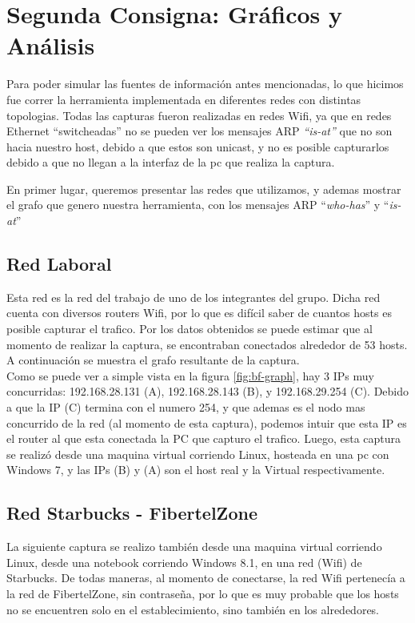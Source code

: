 \section{Segunda Consigna: Gráficos y Análisis}

Para poder simular las fuentes de información antes mencionadas, lo que hicimos fue correr la herramienta implementada en diferentes redes con distintas topologias. Todas las capturas fueron realizadas en redes Wifi, ya que en redes Ethernet ``switcheadas'' no se pueden ver los mensajes ARP \textit{``is-at''} que no son hacia nuestro host, debido a que estos son unicast, y no es posible capturarlos debido a que no llegan a la interfaz de la pc que realiza la captura. 

En primer lugar, queremos presentar las redes que utilizamos, y ademas mostrar el grafo que genero nuestra herramienta, con los mensajes ARP ``\textit{who-has}'' y ``\textit{is-at}''

\subsection{Red Laboral}

Esta red es la red del trabajo de uno de los integrantes del grupo. Dicha red cuenta con diversos routers Wifi, por lo que es difícil saber de cuantos hosts es posible capturar el trafico. Por los datos obtenidos se puede estimar que al momento de realizar la captura, se encontraban conectados alrededor de 53 hosts. A continuación se muestra el grafo resultante de la captura. \\

Como se puede ver a simple vista en la figura \ref{fig:bf-graph}, hay 3 IPs muy concurridas: 192.168.28.131 (A), 192.168.28.143 (B), y 192.168.29.254 (C). Debido a que la IP (C) termina con el numero 254, y que ademas es el nodo mas concurrido de la red (al momento de esta captura), podemos intuir que esta IP es el router al que esta conectada la PC que capturo el trafico. Luego, esta captura se realizó desde una maquina virtual corriendo Linux, hosteada en una pc con Windows 7, y las IPs (B) y (A) son el host real y la Virtual respectivamente.

\FloatBarrier
\subsection{Red Starbucks - FibertelZone}

La siguiente captura se realizo también desde una maquina virtual corriendo Linux, desde una notebook corriendo Windows 8.1, en una red (Wifi) de Starbucks. De todas maneras, al momento de conectarse, la red Wifi pertenecía a la red de FibertelZone, sin contraseña, por lo que es muy probable que los hosts no se encuentren solo en el establecimiento, sino también en los alrededores. \\

